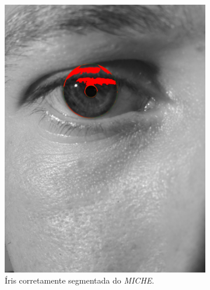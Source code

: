 \begin{figure}[H]
    \centering %
\begin{subfigure}{0.25\textwidth}
  \includegraphics[width=\linewidth]{img/Resultados/miche/miche_seg_boa.jpg}
  \caption{Íris corretamente segmentada do \textit{MICHE}.}
\end{subfigure}\hfil %
\begin{subfigure}{0.25\textwidth}

\end{subfigure}
\end{figure}
